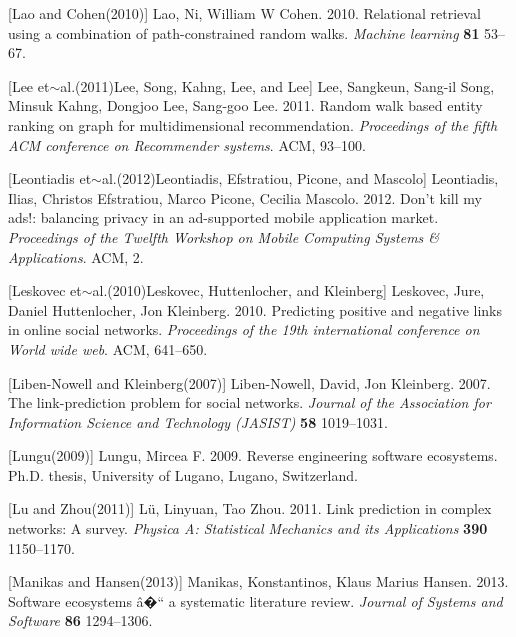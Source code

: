 \documentclass{article} %
\begin{document}
\noindent 

[Lao and Cohen(2010)]  Lao, Ni, William W Cohen. 2010.    Relational retrieval using a combination of path-constrained random walks.    \textit{ Machine learning} \textbf{ 81} 53--67.

\noindent 

[Lee et$\sim$al.(2011)Lee, Song, Kahng, Lee, and Lee]  Lee, Sangkeun, Sang-il Song, Minsuk Kahng, Dongjoo Lee, Sang-goo Lee. 2011.    Random walk based entity ranking on graph for multidimensional recommendation.    \textit{ Proceedings of the fifth ACM conference on Recommender systems}. ACM, 93--100.

\noindent 

[Leontiadis et$\sim$al.(2012)Leontiadis, Efstratiou, Picone, and Mascolo]  Leontiadis, Ilias, Christos Efstratiou, Marco Picone, Cecilia Mascolo. 2012.    Don't kill my ads!: balancing privacy in an ad-supported mobile application market.    \textit{ Proceedings of the Twelfth Workshop on Mobile Computing Systems \& Applications}. ACM, 2.

\noindent 

[Leskovec et$\sim$al.(2010)Leskovec, Huttenlocher, and Kleinberg]  Leskovec, Jure, Daniel Huttenlocher, Jon Kleinberg. 2010.    Predicting positive and negative links in online social networks.    \textit{ Proceedings of the 19th international conference on World wide web}. ACM, 641--650.

\noindent 

[Liben-Nowell and Kleinberg(2007)]  Liben-Nowell, David, Jon Kleinberg. 2007.    The link-prediction problem for social networks.    \textit{ Journal of the Association for Information Science and Technology (JASIST)} \textbf{ 58} 1019--1031.

\noindent 

[Lungu(2009)]  Lungu, Mircea F. 2009.    Reverse engineering software ecosystems.    Ph.D. thesis, University of Lugano, Lugano, Switzerland.

\noindent 

[Lu and Zhou(2011)]  L\"{u}, Linyuan, Tao Zhou. 2011.    Link prediction in complex networks: A survey.    \textit{ Physica A: Statistical Mechanics and its Applications} \textbf{ 390} 1150--1170.

\noindent 

[Manikas and Hansen(2013)]  Manikas, Konstantinos, Klaus Marius Hansen. 2013.    Software ecosystems \^{a}�`` a systematic literature review.    \textit{ Journal of Systems and Software} \textbf{ 86} 1294--1306.
\end{document}
